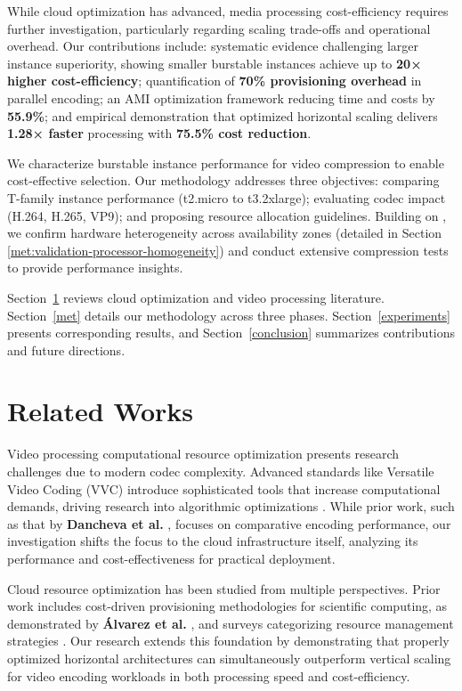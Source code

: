 \documentclass[conference]{IEEEtran}
\begin{document}
	While cloud optimization has advanced, media processing cost-efficiency requires further investigation, particularly regarding scaling trade-offs and operational overhead. Our contributions include: systematic evidence challenging larger instance superiority, showing smaller burstable instances achieve up to \textbf{20× higher cost-efficiency}; quantification of \textbf{70\% provisioning overhead} in parallel encoding; an AMI optimization framework reducing time and costs by \textbf{55.9\%}; and empirical demonstration that optimized horizontal scaling delivers \textbf{1.28× faster} processing with \textbf{75.5\% cost reduction}.
	
	We characterize burstable instance performance for video compression to enable cost-effective selection. Our methodology addresses three objectives: comparing T-family instance performance (t2.micro to t3.2xlarge); evaluating codec impact (H.264, H.265, VP9); and proposing resource allocation guidelines. Building on \cite{b3}, we confirm hardware heterogeneity across availability zones (detailed in Section \ref{met:validation-processor-homogeneity}) and conduct extensive compression tests to provide performance insights.
	
	Section~\ref{rel_works} reviews cloud optimization and video processing literature. Section~\ref{met} details our methodology across three phases. Section~\ref{experiments} presents corresponding results, and Section~\ref{conclusion} summarizes contributions and future directions.
	
	\section{Related Works}
	\label{rel_works}
	
	Video processing computational resource optimization presents research challenges due to modern codec complexity. Advanced standards like Versatile Video Coding (VVC) introduce sophisticated tools that increase computational demands, driving research into algorithmic optimizations \cite{b15, b16}. While prior work, such as that by \textbf{Dancheva et al.} \cite{b3}, focuses on comparative encoding performance, our investigation shifts the focus to the cloud infrastructure itself, analyzing its performance and cost-effectiveness for practical deployment.
	
	Cloud resource optimization has been studied from multiple perspectives. Prior work includes cost-driven provisioning methodologies for scientific computing, as demonstrated by \textbf{Álvarez et al.} \cite{b2}, and surveys categorizing resource management strategies \cite{b4}. Our research extends this foundation by demonstrating that properly optimized horizontal architectures can simultaneously outperform vertical scaling for video encoding workloads in both processing speed and cost-efficiency.
	
\end{document}
